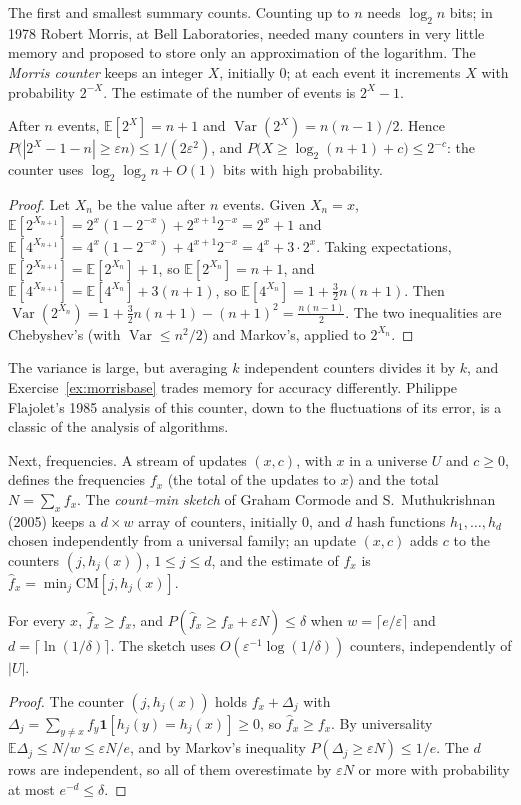The first and smallest summary counts. Counting up to $n$ needs $\log_2n$ bits; in 1978 Robert Morris, at Bell Laboratories, needed many counters in very little memory and proposed to store only an approximation of the logarithm. The \emph{Morris counter} keeps an
integer $X$, initially $0$; at each event it increments $X$ with probability $2^{-X}$. The estimate of the number of events is $2^X-1$.

\begin{theorem}[Morris, 1978]\label{thm:morris}
After $n$ events, $\mathbb E[2^{X}]=n+1$ and $\operatorname{Var}(2^X)=n(n-1)/2$. Hence $P\bigl(|2^X-1-n|\ge\varepsilon n\bigr)\le1/(2\varepsilon^2)$, and $P\bigl(X\ge\log_2(n+1)+c\bigr)\le2^{-c}$: the counter uses $\log_2\log_2n+O(1)$ bits with high probability.
\end{theorem}
\begin{proof}
Let $X_n$ be the value after $n$ events. Given $X_n=x$, $\mathbb E[2^{X_{n+1}}]=2^x(1-2^{-x})+2^{x+1}2^{-x}=2^x+1$ and $\mathbb E[4^{X_{n+1}}]=4^x(1-2^{-x})+4^{x+1}2^{-x}=4^x+3\cdot2^x$. Taking expectations, $\mathbb E[2^{X_{n+1}}]=\mathbb E[2^{X_n}]+1$, so $\mathbb E[2^{X_n}]=n+1$, and
$\mathbb E[4^{X_{n+1}}]=\mathbb E[4^{X_n}]+3(n+1)$, so $\mathbb E[4^{X_n}]=1+\frac32n(n+1)$. Then $\operatorname{Var}(2^{X_n})=1+\frac32n(n+1)-(n+1)^2=\frac{n(n-1)}2$. The two inequalities are Chebyshev's (with $\operatorname{Var}\le n^2/2$) and Markov's, applied to $2^{X_n}$.
\end{proof}

The variance is large, but averaging $k$ independent counters divides it by $k$, and Exercise~\ref{ex:morrisbase} trades memory for accuracy differently. Philippe Flajolet's 1985 analysis of this counter, down to the fluctuations of its error, is a classic of the analysis of algorithms.

Next, frequencies. A stream of updates $(x,c)$, with $x$ in a universe $U$ and $c\ge0$, defines the frequencies $f_x$ (the total of the updates to $x$) and the total $N=\sum_xf_x$. The \emph{count--min sketch} of Graham Cormode and S.~Muthukrishnan (2005) keeps a $d\times w$ array of
counters, initially $0$, and $d$ hash functions $h_1,\dots,h_d$ chosen independently from a universal family; an update $(x,c)$ adds $c$ to the counters $(j,h_j(x))$, $1\le j\le d$, and the estimate of $f_x$ is $\hat f_x=\min_j\mathrm{CM}[j,h_j(x)]$.

\begin{theorem}\label{thm:countmin}
For every $x$, $\hat f_x\ge f_x$, and $P(\hat f_x\ge f_x+\varepsilon N)\le\delta$ when $w=\lceil e/\varepsilon\rceil$ and $d=\lceil\ln(1/\delta)\rceil$. The sketch uses $O(\varepsilon^{-1}\log(1/\delta))$ counters, independently of $|U|$.
\end{theorem}
\begin{proof}
The counter $(j,h_j(x))$ holds $f_x+\Delta_j$ with $\Delta_j=\sum_{y\ne x}f_y\mathbf 1[h_j(y)=h_j(x)]\ge0$, so $\hat f_x\ge f_x$. By universality $\mathbb E\Delta_j\le N/w\le\varepsilon N/e$, and by Markov's inequality $P(\Delta_j\ge\varepsilon N)\le1/e$. The $d$ rows are independent, so all of
them overestimate by $\varepsilon N$ or more with probability at most $e^{-d}\le\delta$.
\end{proof}


